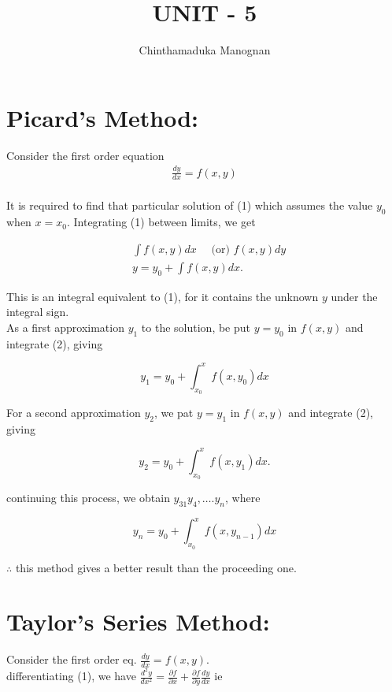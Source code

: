 \documentclass[12pt]{exam}
\title{UNIT - 5}
\author{Chinthamaduka Manognan}
\begin{document}
\maketitle

\section{Picard's Method:}

Consider the first order equation 
\begin{align*}
    \frac{d y}{d x}=f(x, y) \tag{1}\\
\end{align*}

It is required to find that particular solution of (1) which assumes the value $y_{0}$ when $x=x_{0}$. Integrating (1) between limits, we get

\begin{align*}
& \int f(x, y) d x \quad \text { (or) } f(x, y) d y  \tag{2}\\[10pt]
& y=y_{0}+\int f(x, y) d x .
\end{align*}

This is an integral equivalent to (1), for it contains the unknown $y$ under the integral sign.\\
As a first approximation $y_{1}$ to the solution, be put $y=y_{0}$ in $f(x, y)$ and integrate (2), giving

$$
y_{1}=y_{0}+\int_{x_{0}}^{x} f\left(x, y_{0}\right) d x
$$

For a second approximation $y_{2}$, we pat $y=y_{1}$ in $f(x, y)$ and integrate (2), giving

$$
y_{2}=y_{0}+\int_{x_{0}}^{x} f\left(x, y_{1}\right) d x .
$$

continuing this process, we obtain $y_{31} y_{4}, \ldots . y_{n}$, where

$$
y_{n}=y_{0}+\int_{x_{0}}^{x} f\left(x, y_{n-1}\right) d x
$$

$\therefore$ this method gives a better result than the proceeding one.\\[10pt]


\newpage


\section{Taylor's Series Method:}
Consider the first order eq. $\frac{d y}{d x}=f(x, y)$.\\[10pt]
differentiating (1), we have $\frac{d^{2} y}{d x^{2}}=\frac{\partial f}{\partial x}+\frac{\partial f}{\partial y} \frac{d y}{d x}$ ie
\end{document}
